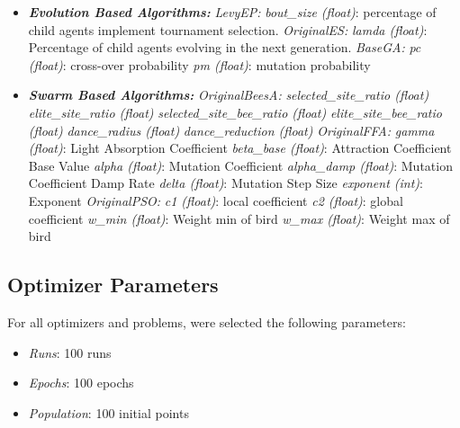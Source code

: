 \documentclass[conference]{IEEEtran}
\begin{document}
\begin{itemize}
    \item \textit{\textbf{Evolution Based Algorithms: }}
        \subitem \textit{LevyEP:}
            \subsubitem \textit{bout\_size (float)}: percentage of child agents implement tournament selection.
        \subitem \textit{OriginalES:}
            \subsubitem \textit{lamda (float)}: Percentage of child agents evolving in the next generation.
        \subitem \textit{BaseGA:}
            \subsubitem \textit{pc (float)}: cross-over probability
            \subsubitem \textit{pm (float)}: mutation probability
    \item \textit{\textbf{Swarm Based Algorithms: }}
        \subitem \textit{OriginalBeesA:}
            \subsubitem \textit{selected\_site\_ratio (float)}
            \subsubitem \textit{elite\_site\_ratio (float)}
            \subsubitem \textit{selected\_site\_bee\_ratio (float)}
            \subsubitem \textit{elite\_site\_bee\_ratio (float)}
            \subsubitem \textit{dance\_radius (float)}
            \subsubitem \textit{dance\_reduction (float)}
        \subitem \textit{OriginalFFA:}
            \subsubitem \textit{gamma (float)}: Light Absorption Coefficient
            \subsubitem \textit{beta\_base (float)}: Attraction Coefficient Base Value
            \subsubitem \textit{alpha (float)}: Mutation Coefficient
            \subsubitem \textit{alpha\_damp (float)}: Mutation Coefficient Damp Rate
            \subsubitem \textit{delta (float)}: Mutation Step Size
            \subsubitem \textit{exponent (int)}: Exponent
        \subitem \textit{OriginalPSO:}
            \subsubitem \textit{c1 (float)}: local coefficient
            \subsubitem \textit{c2 (float)}: global coefficient
            \subsubitem \textit{w\_min (float)}: Weight min of bird
            \subsubitem \textit{w\_max (float)}: Weight max of bird

\end{itemize}

\subsection{Optimizer Parameters}
\label{subsec:methodology-optimizer-parameters}

For all optimizers and problems, were selected the following parameters:

\begin{itemize}
    \item \textit{Runs}: 100 runs
    \item \textit{Epochs}: 100 epochs
    \item \textit{Population}: 100 initial points
\end{itemize}
\end{document}
